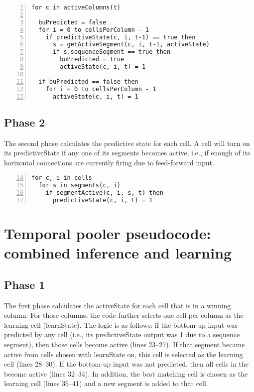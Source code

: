 \documentclass{report}
\begin{document}
\begin{lstlisting}[numbers=left]
for c in activeColumns(t)

  buPredicted = false
  for i = 0 to cellsPerColumn - 1
    if predictiveState(c, i, t-1) == true then
      s = getActiveSegment(c, i, t-1, activeState)
      if s.sequenceSegment == true then
        buPredicted = true
        activeState(c, i, t) = 1

  if buPredicted == false then
    for i = 0 to cellsPerColumn - 1
      activeState(c, i, t) = 1
\end{lstlisting}

\subsection*{Phase 2}
The second phase calculates the predictive state for each cell. A cell
will turn on its predictiveState if any one of its segments becomes
active, i.e., if enough of its horizontal connections are currently
firing due to feed-forward input.

\begin{lstlisting}[numbers=left,firstnumber=14]
for c, i in cells
  for s in segments(c, i)
    if segmentActive(c, i, s, t) then
      predictiveState(c, i, t) = 1
\end{lstlisting}

\section*{Temporal pooler pseudocode: combined inference and learning}

\subsection*{Phase 1}

The first phase calculates the activeState for each cell that is in a
winning column. For those columns, the code further selects one cell
per column as the learning cell (learnState). The logic is as follows:
if the bottom-up input was predicted by any cell (i.e., its
predictiveState output was 1 due to a sequence segment), then those
cells become active (lines 23--27). If that segment became active from
cells chosen with learnState on, this cell is selected as the learning
cell (lines 28--30). If the bottom-up input was not predicted, then
all cells in the become active (lines 32--34). In addition, the best
matching cell is chosen as the learning cell (lines 36--41) and a new
segment is added to that cell.
\end{document}
